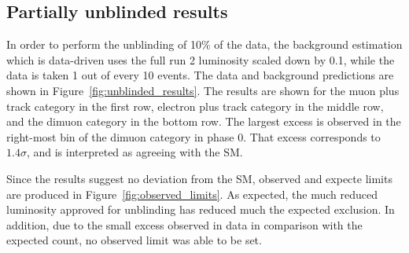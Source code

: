 \subsection{Partially unblinded results}
\label{sec:unblinded-limits}

In order to perform the unblinding of 10\% of the data, the background estimation which is data-driven uses the full run 2 luminosity scaled down by 0.1, while the data is taken 1 out of every 10 events. The data and background predictions are shown in Figure~\ref{fig:unblinded_results}. The results are shown for the muon plus track category in the first row, electron plus track category in the middle row, and the dimuon category in the bottom row. The largest excess is observed in the right-most bin of the dimuon category in phase 0. That excess corresponds to $1.4\sigma$, and is interpreted as agreeing with the SM. 

Since the results suggest no deviation from the SM, observed and expecte limits are produced in Figure~\ref{fig:observed_limits}. As expected, the much reduced luminosity approved for unblinding has reduced much the expected exclusion. In addition, due to the small excess observed in data in comparison with the expected count, no observed limit was able to be set.

